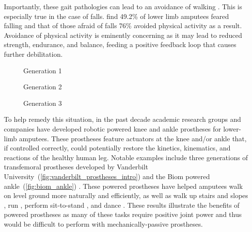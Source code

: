 Importantly, these gait pathologies can lead to an avoidance of walking
\citep{gauthier1999enabling}. This is especially true in the case of falls.
\citet{miller2001prevalence} find 49.2\% of lower limb amputees feared falling
and that of those afraid of falls 76\% avoided physical activity as a result.
Avoidance of physical activity is eminently concerning as it may lead to reduced
strength, endurance, and balance, feeding a positive feedback loop that causes
further debilitation.
\begin{figure*}[b]
    \centering
	\begin{subfigure}[b]{0.3\textwidth}
    	\centering
        \caption{Generation 1}
	\end{subfigure}
	\begin{subfigure}[b]{0.3\textwidth}
    	\centering
        \caption{Generation 2}
	\end{subfigure}
	\begin{subfigure}[b]{0.3\textwidth}
    	\centering
        \caption{Generation 3}
	\end{subfigure}
    \caption{Vanderbilt University's Robotic Transfemoral
    Prostheses.\vspace{0.1in}}
    \label{fig:vanderbilt_prostheses_intro}
\end{figure*}

To help remedy this situation, in the past decade academic research groups and
companies have developed robotic powered knee and ankle prostheses for
lower-limb amputees.  These prostheses feature actuators at the knee and/or
ankle that, if controlled correctly, could potentially restore the kinetics,
kinematics, and reactions of the healthy human leg. Notable examples include
three generations of transfemoral prostheses developed by Vanderbilt
University~(\cref{fig:vanderbilt_prostheses_intro}) \citep{sup2009preliminary,
lawson2013control, lawson2014robotic} and the Biom powered
ankle~(\cref{fig:biom_ankle}) \citep{herr2012bionic}. These powered prostheses
have helped amputees walk on level ground more naturally and efficiently, as
well as walk up stairs and slopes \citep{sup2011upslope, lawson2013control}, run
\citep{huff2012running, shultz2015running}, perform sit-to-stand
\citep{varol2009powered}, and dance \citep{rouse2015design}. These results
illustrate the benefits of powered prostheses as many of these tasks require
positive joint power and thus would be difficult to perform with
mechanically-passive prostheses.

